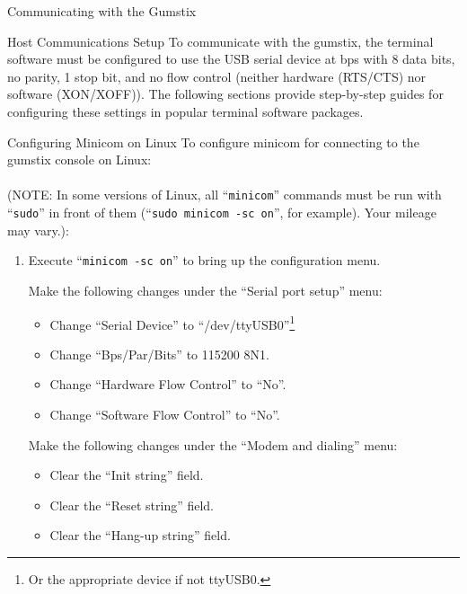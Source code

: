 \documentclass{article}
\begin{document}
\begin{section}{Communicating with the Gumstix}
\begin{subsection}{Host Communications Setup}
	To communicate with the gumstix, the terminal software must be
	configured to use the USB serial device at \unit[115200]{bps}
	with 8 data bits, no parity, 1 stop bit, and no flow control
	(neither hardware (RTS/CTS) nor software (XON/XOFF)).  The
	following sections provide step-by-step guides for configuring
	these settings in popular terminal software packages.

	\begin{subsubsection}{Configuring Minicom on Linux} To
	configure minicom for connecting to the gumstix console on
	Linux:\\\\
    (NOTE: In some versions of Linux, all ``\verb|minicom|''
	commands must be run with ``\verb|sudo|'' in front of them
	(``\verb|sudo minicom -sc on|'', for example). Your mileage may vary.):

	\begin{enumerate} 
		\item Execute ``\verb|minicom -sc on|'' to bring up the configuration menu.

		\begin{item}
						Make the following changes under the ``Serial port setup'' menu:
						\begin{itemize}
							\item Change ``Serial Device'' to ``/dev/ttyUSB0''\footnote{Or the
							      appropriate device if not ttyUSB0.}
							\item Change ``Bps/Par/Bits'' to 115200 8N1.
							\item Change ``Hardware Flow Control'' to ``No''.
							\item Change ``Software Flow Control'' to ``No''.
						\end{itemize}
					\end{item}

					\begin{item}
						Make the following changes under the ``Modem and dialing'' menu:
						\begin{itemize}
							\item Clear the ``Init string'' field.
							\item Clear the ``Reset string'' field.
							\item Clear the ``Hang-up string'' field.
						\end{itemize}
					\end{item}


\end{enumerate}
\end{subsubsection}
\end{subsection}
\end{section}
\end{document}
